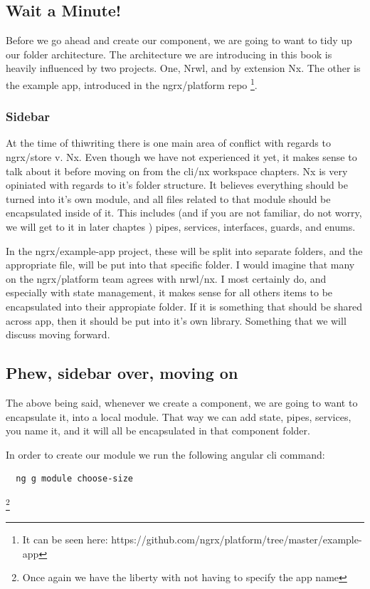 \subsection {Wait a Minute!}
Before we go ahead and create our component, we are going to want to tidy up
our folder architecture. The architecture we are introducing in this book is
heavily influenced by two projects. One, Nrwl, and by extension Nx. The other is
the example app, introduced in the ngrx/platform repo \footnote{It can be seen
here: https://github.com/ngrx/platform/tree/master/example-app}.

\subsubsection {Sidebar}
At the time of thiwriting there is one main area of conflict with regards to
ngrx/store v. Nx. Even though we have not experienced it yet, it makes sense to
talk about it before moving on from the cli/nx workspace chapters. Nx is very
opiniated with regards to it's folder structure. It believes everything should
be turned into it's own module, and all files related to that module should
be encapsulated inside of it. This includes (and if you are not familiar, do not
worry, we will get to it in later chaptes ) pipes, services, interfaces, guards,
and enums.

In the ngrx/example-app project, these will be split into separate folders, and
the appropriate file, will be put into that specific folder. I would imagine
that many on the ngrx/platform team agrees with nrwl/nx. I most certainly do,
and especially with state management, it makes sense for all others items to
be encapsulated into their appropiate folder. If it is something that should be
shared across app, then it should be put into it's own library. Something that
we will discuss moving forward.

\subsection {Phew, sidebar over, moving on}

The above being said, whenever we create a component, we are going to want to
encapsulate it, into a local module. That way we can add state, pipes, services,
you name it, and it will all be encapsulated in that component folder.

In order to create our module we run the following angular cli command:

\begin{verbatim}
  ng g module choose-size
\end{verbatim} \footnote{Once again we have the liberty with not having to
specify the app name}

